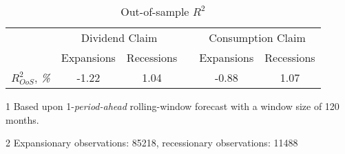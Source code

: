 \begin{table}[H]
\centering
\caption{Out-of-sample $R^2$}
\label{tab:R2OS}
\begin{threeparttable}
\begin{tabular}{@{}lccccc@{}}
\toprule
                         & \multicolumn{2}{c}{Dividend Claim} && \multicolumn{2}{c}{Consumption Claim} \\ 
                         \addlinespace
& Expansions       & Recessions      && Expansions        & Recessions        \\
\cmidrule(lr){2-3} \cmidrule(lr){5-6}
$R^2_{OoS}$, \textit{\%} & -1.22            & 1.04            && -0.88             & 1.07              \\ \bottomrule
\end{tabular}
\begin{tablenotes}\footnotesize{
\item[1] Based upon 1-\textit{period-ahead} rolling-window forecast with a window size of 120 months.
\item[2] Expansionary observations: 85218, recessionary observations: 11488}
\end{tablenotes}
\end{threeparttable}
\end{table}
